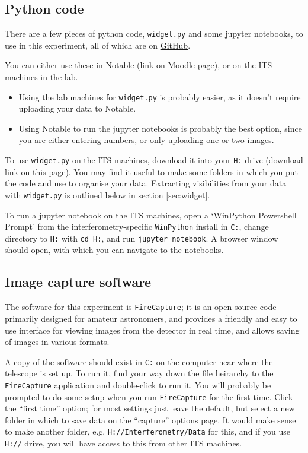 \documentclass[11pt]{article}
\begin{document}
\subsection{Python code}

There are a few pieces of python code, \texttt{widget.py} and some jupyter notebooks, to use in this experiment, all of which are on \href{https://github.com/drgmk/px-interferometry}{GitHub}.

You can either use these in Notable (link on Moodle page), or on the ITS machines in the lab.
\begin{itemize}
    \item Using the lab machines for \texttt{widget.py} is probably easier, as it doesn't require uploading your data to Notable.
    \item Using Notable to run the jupyter notebooks is probably the best option, since you are either entering numbers, or only uploading one or two images.
\end{itemize}
To use \texttt{widget.py} on the ITS machines, download it into your \texttt{H:} drive (download link on \href{https://github.com/drgmk/px-interferometry/blob/main/widget.py}{this page}). You may find it useful to make some folders in which you put the code and use to organise your data. Extracting visibilities from your data with \texttt{widget.py} is outlined below in section \ref{sec:widget}.

To run a jupyter notebook on the ITS machines, open a `WinPython Powershell Prompt' from the interferometry-specific \texttt{WinPython} install in \texttt{C:}, change directory to \texttt{H:} with \texttt{cd H:}, and run \texttt{jupyter notebook}. A browser window should open, with which you can navigate to the notebooks.

\subsection{Image capture software}\label{sec:software}

The software for this experiment is \href{http://www.firecapture.de/}{\texttt{FireCapture}}; it is an open source code primarily designed for amateur astronomers, and provides a friendly and easy to use interface for viewing images from the detector in real time, and allows saving of images in various formats.

A copy of the software should exist in \texttt{C:} on the computer near where the telescope is set up. To run it, find your way down the file heirarchy to the \texttt{FireCapture} application and double-click to run it. You will probably be prompted to do some setup when you run \texttt{FireCapture} for the first time. Click the ``first time'' option; for most settings just leave the default, but select a new folder in which to save data on the ``capture'' options page. It would make sense to make another folder, e.g. \texttt{H://Interferometry/Data} for this, and if you use \texttt{H://} drive, you will have access to this from other ITS machines.
\end{document}
